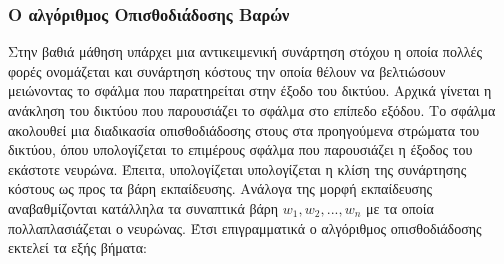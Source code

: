 \subsubsection{Ο αλγόριθμος  Οπισθοδιάδοσης Βαρών  \cite{haykin2009neural, rumelhart1988learning}}

Στην βαθιά μάθηση υπάρχει μια αντικειμενική συνάρτηση στόχου η οποία πολλές φορές ονομάζεται και συνάρτηση κόστους την οποία θέλουν να βελτιώσουν μειώνοντας το σφάλμα που παρατηρείται στην έξοδο του δικτύου. Αρχικά γίνεται η ανάκληση του δικτύου που παρουσιάζει το σφάλμα στο επίπεδο εξόδου. Το σφάλμα ακολουθεί μια διαδικασία οπισθοδιάδοσης στους στα προηγούμενα στρώματα του δικτύου, όπου υπολογίζεται το επιμέρους σφάλμα που παρουσιάζει η έξοδος του εκάστοτε νευρώνα. Έπειτα, υπολογίζεται υπολογίζεται η κλίση της συνάρτησης κόστους ως προς τα βάρη εκπαίδευσης.  Ανάλογα της μορφή εκπαίδευσης αναβαθμίζονται κατάλληλα τα συναπτικά βάρη \(w_1,w_2,...,w_n\) με τα οποία  πολλαπλασιάζεται ο νευρώνας.  Έτσι επιγραμματικά ο αλγόριθμος οπισθοδιάδοσης εκτελεί τα εξής βήματα:
